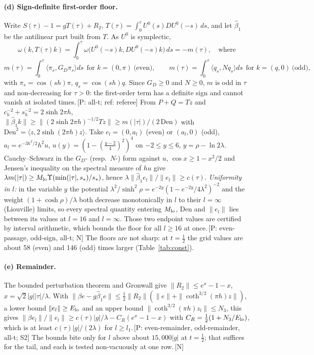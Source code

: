 \documentclass[11pt]{article}
\newcommand{\GD}{G_{\!D}}
\newcommand{\ip}[2]{\langle #1,#2\rangle}
\newcommand{\ev}[1]{\,{\textsf{\scriptsize[#1]}}}
\begin{document}
\paragraph{(d) Sign-definite first-order floor.} Write $S(\tau)-1=gT(\tau)+R_2$, $T(\tau)=\int_0^\tau U^0(s)DU^0(-s)\,ds$, and let $\hat\beta_1$ be the antilinear part built from $T$. As $U^0$ is symplectic,
\[
\omega(k,T(\tau)k)=\int_0^\tau\omega\bigl(U^0(-s)k,DU^0(-s)k\bigr)\,ds=-m(\tau),\quad\text{where}
\]
\[
m(\tau)=\int_0^\tau\ip{\pi_s}{\GD\pi_s}ds\ \ \text{for }k=(0,\pi)\ \text{(even)},\qquad m(\tau)=\int_0^\tau\ip{q_s}{Nq_s}ds\ \ \text{for }k=(q,0)\ \text{(odd)},
\]
with $\pi_s=\cos(sh)\pi$, $q_s=\cos(sh)q$. Since $\GD\ge0$ and $N\ge0$, $m$ is odd in $\tau$ and non-decreasing for $\tau>0$: the first-order term has a definite sign and cannot vanish at isolated times.\ev{P: all-t; ref: referee} From $P+Q=Tz$ and $c_h^{-2}+s_h^{-2}=2\sinh2\pi h$, $\|\hat\beta_1k\|\ge\|(2\sinh2\pi h)^{-1/2}Tz\|\ge m(|\tau|)/(2\,\mathrm{Den})$ with $\mathrm{Den}^2=\ip z{2\sinh(2\pi h)z}$. Take $e_l=(0,a_l)$ (even) or $(a_l,0)$ (odd), $a_l=e^{-3h^2/2}h^2u$, $u(y)=(1-(\frac{y-2}4)^2)^4$ on $-2\le y\le6$, $y=\rho-\ln2\lambda$. Cauchy--Schwarz in the $\GD$- (resp.\ $N$-) form against $u$, $\cos x\ge1-x^2/2$ and Jensen's inequality on the spectral measure of $hu$ give $\lambda m(|\tau|)\ge M_{\rm lo}\Upsilon(\min(|\tau|,s_*)/s_*)$, hence $\lambda\|\hat\beta_1e_l\|/\|e_l\|\ge c(\tau)$. \emph{Uniformity in $l$:} in the variable $y$ the potential $\lambda^2/\sinh^2\rho=e^{-2y}(1-e^{-2y}/4\lambda^2)^{-2}$ and the weight $(1+\cosh\rho)/\lambda$ both decrease monotonically in $l$ to their $l=\infty$ (Liouville) limits, so every spectral quantity entering $M_{\rm lo}$, $\mathrm{Den}$ and $\|e_l\|$ lies between its values at $l=16$ and $l=\infty$. Those two endpoint values are certified by interval arithmetic, which bounds the floor for all $l\ge16$ at once.\ev{P: even-passage, odd-sign, all-t; N} The floors are not sharp: at $t=\frac12$ the grid values are about 58 (even) and 146 (odd) times larger (Table~\ref{tab:const}).

\paragraph{(e) Remainder.} The bounded perturbation theorem and Gronwall give $\|R_2\|\le e^x-1-x$, $x=\sqrt2|g||\tau|/\lambda$. With $\|\beta e-g\hat\beta_1e\|\le\frac12\|R_2\|(\|e\|+\|\coth^{3/2}(\pi h)z\|)$, a lower bound $\|e_l\|\ge E_{\rm lo}$ and an upper bound $\|\coth^{3/2}(\pi h)z_l\|\le N_3$, this gives $\|\beta e_l\|/\|e_l\|\ge c(\tau)|g|/\lambda-C_R(e^x-1-x)$ with $C_R=\frac12(1+N_3/E_{\rm lo})$, which is at least $c(\tau)|g|/(2\lambda)$ for $l\ge l_1$.\ev{P: even-remainder, odd-remainder, all-t; S2} The bounds bite only for $l$ above about $15{,}000|g|$ at $t=\frac12$; that suffices for the tail, and each is tested non-vacuously at one row.\ev{N}
\end{document}
